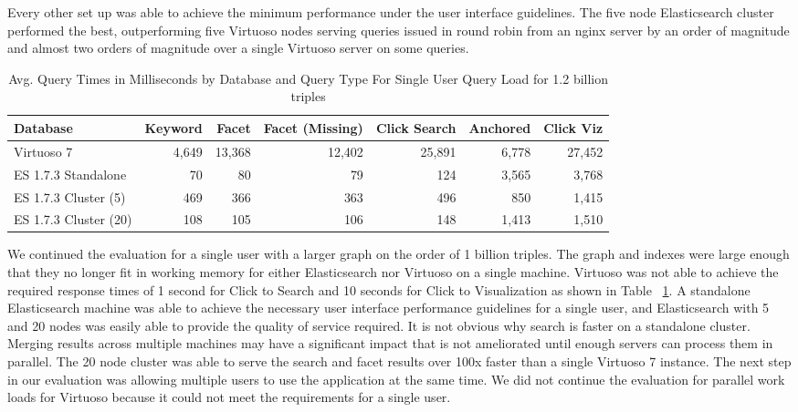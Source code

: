 Every other set up was able to achieve the minimum performance under the user interface guidelines. 
The five node Elasticsearch cluster performed the best, outperforming five Virtuoso nodes serving queries issued in round robin from an nginx server by an order of magnitude and almost two orders of magnitude over a single Virtuoso server on some queries. 

\begin{table} 
\centering
\scriptsize{
    \begin{tabular}{ l||r|r|r|r|r|r }
        Database & Keyword & Facet & Facet (Missing) & Click Search & Anchored & Click Viz \\ \hline
        Virtuoso 7 & 4,649 & 13,368 & 12,402 & 25,891 & 6,778 &  27,452 \\ 
        ES 1.7.3 Standalone & 70 & 80 & 79 & 124 & 3,565 & 3,768 \\ 
        ES 1.7.3 Cluster (5) & 469 & 366 & 363 & 496 & 850 & 1,415 \\ 
        ES 1.7.3 Cluster (20) & 108 & 105 & 106 & 148 & 1,413 & 1,510 \\ 
    \end{tabular} 
    }
    \centering
    \caption{Avg. Query Times in Milliseconds by Database and Query Type For Single User Query Load for 1.2 billion triples}
    \label{table:qt_single_user_1b}
    \vspace{-0.2cm}
\end{table}

We continued the evaluation for a single user with a larger graph on the order of 1 billion triples.  
The graph and indexes were large enough that they no longer fit in working memory for either Elasticsearch nor Virtuoso on a single machine.
Virtuoso was not able to achieve the required response times of 1 second for Click to Search and 10 seconds for Click to Visualization as shown in Table ~\ref{table:qt_single_user_1b}.
A standalone Elasticsearch machine was able to achieve the necessary user interface performance guidelines for a single user, and Elasticsearch with 5 and 20 nodes was easily able to provide the quality of service required.
It is not obvious why search is faster on a standalone cluster.
Merging results across multiple machines may have a significant impact that is not ameliorated until enough servers can process them in parallel. 
The 20 node cluster was able to serve the search and facet results over 100x faster than a single Virtuoso 7 instance. 
The next step in our evaluation was allowing multiple users to use the application at the same time.
We did not continue the evaluation for parallel work loads for Virtuoso because it could not meet the requirements for a single user.

